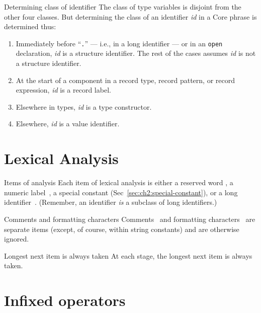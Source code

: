\begin{clause}{Determining class of identifier}
The class of type variables is disjoint from the other four classes. But
determining the class of an identifier \textit{id} in a Core phrase is
determined thus:
\begin{enumerate}
\item Immediately before ``\texttt{.}'' --- i.e., in a long identifier
  --- or in an \texttt{open} declaration, \textit{id} is a structure
  identifier. The rest of the cases assumes \textit{id} is not a structure identifier.
\item At the start of a component in a record type, record pattern, or
  record expression, \textit{id} is a record label.
\item Elsewhere in types, \textit{id} is a type constructor.
\item Elsewhere, \textit{id} is a value identifier.
\end{enumerate}
\end{clause}

\section{Lexical Analysis}

\begin{clause}{Items of analysis}
Each item of lexical analysis is either a reserved word
,
a numeric label~, 
a special constant (Sec~\ref{sec:ch2:special-constant}),
or a long identifier~.
(Remember, an identifier \emph{is} a subclass of long identifiers.)
\end{clause}

\begin{clause}{Comments and formatting characters}
Comments~ and formatting
characters~ are separate
items (except, of course, within string constants) and are otherwise ignored.
\end{clause}

\begin{clause}{Longest next item is always taken}
At each stage, the longest next item is always taken.
\end{clause}

\section{Infixed operators}

